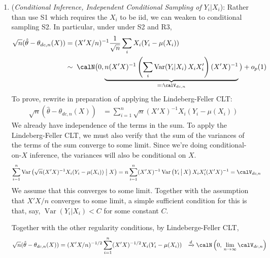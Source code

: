 \documentclass[12pt]{article}
\theoremstyle{plain}
\theoremstyle{definition}
\theoremstyle{remark}
\newcommand{\ra}{\rightarrow}
\newcommand{\Var}{\operatorname{Var}}
\newcommand{\dto}{\xrightarrow{d}}
\newcommand{\sumin}{\sum^n_{i=1}}
\begin{document}
\begin{enumerate}

  \item
    (\emph{Conditional Inference, Independent Conditional Sampling of $Y_i|X_i$}):
    Rather than use S1 which requires the $X_i$ to be iid, we can weaken
    to conditional sampling S2.
    In particular, under under S2 and R3,
    \begin{align*}
      \sqrt{n}(\hat{\theta}-\theta_{dc,n}(X))
      &=
      (X'X/n)^{-1}
      \frac{1}{\sqrt{n}}
      \sum_i
      X_i
        (Y_i-\mu(X_i))
      \\
      &\sim
      \;
      \calN\big(
        0,
        \underbrace{%
          n(X'X)^{-1}
          \left(
          \sum_i
          \Var(Y_i|X_i)\,X_iX_i'
          \right)
          (X'X)^{-1}
        }_{=:\calV_{dc,n}}
      \big)
      +
      o_p(1)
    \end{align*}
    To prove, rewrite in preparation of applying the Lindeberg-Feller
    CLT:
    \begin{align*}
      \sqrt{n}(\hat{\theta}-\theta_{dc,n}(X))
      &=
      \sumin
      \sqrt{n}
      (X'X)^{-1}
      X_i
      (Y_i-\mu(X_i))
    \end{align*}
    We already have independence of the terms in the sum.
    To apply the Lindeberg-Feller CLT, we must also verify that the sum
    of the variances of the terms of the sum converge to some limit.
    Since we're doing conditional-on-$X$ inference, the variances will
    also be conditional on $X$.
    \begin{align*}
      \sumin
      \Var\left(
      \sqrt{n}
      (X'X)^{-1}
      X_i
      (Y_i-\mu(X_i))
      \;\big|\;
      X
      \right)
      &=
      n
      \sumin
      (X'X)^{-1}
      \Var\left(
      Y_i
      \,\big|\,
      X
      \right)
      X_i
      X_i'
      (X'X)^{-1}
      =
      \calV_{dc,n}
    \end{align*}
    We assume that this converges to some limit.
    Together with the assumption that $X'X/n$ converges to some limit,
    a simple sufficient condition for this is that, say,
    $\Var(Y_i|X_i)<C$ for some constant $C$.

    Together with the other regularity conditions,
    by Lindeberge-Feller CLT,
    \begin{align*}
      \sqrt{n}(\hat{\theta}-\theta_{dc,n}(X))
      &=
      (X'X/n)^{-1/2}
      \sumin
      (X'X)^{-1/2}
      X_i
      (Y_i-\mu(X_i))
      &\dto
      \calN\left(
      0,\,
      \lim_{n\ra\infty}
      \calV_{dc,n}
      \right)
    \end{align*}


\end{enumerate}
\end{document}
